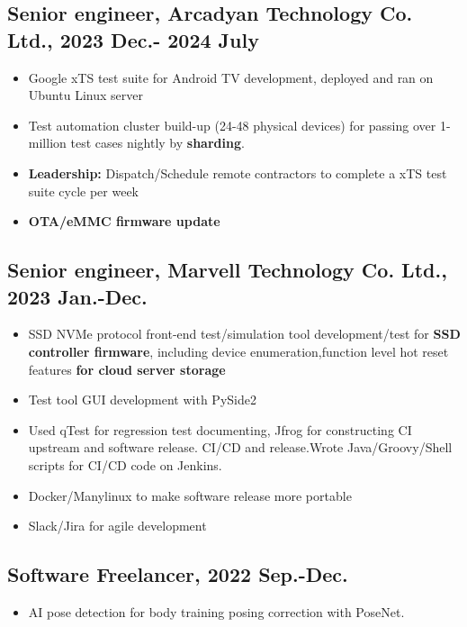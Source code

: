 \documentclass[11pt]{article}
\begin{document}
\begin{multicols*}{2}
\vspace{0.8em}

\subsection*{Senior engineer, Arcadyan Technology Co. Ltd., 2023 Dec.- 2024 July }
\begin{itemize}[noitemsep]
    \item Google xTS test suite for Android TV development, deployed and ran on Ubuntu Linux server
    \item Test automation cluster build-up (24-48 physical devices) for passing over 1-million test cases nightly by \textbf{sharding}.
    \item \textbf{Leadership:} Dispatch/Schedule remote contractors to complete a xTS test suite cycle per week
    \item \textbf{OTA/eMMC firmware update}
\end{itemize}

\vspace{0.8em}

\subsection*{Senior engineer, Marvell Technology Co. Ltd., 2023 Jan.-Dec.}
\begin{itemize}[noitemsep]
    \item SSD NVMe protocol front-end test/simulation tool development/test for \textbf{SSD controller firmware}, including device enumeration,function level hot reset features\textbf{ for cloud server storage}
    \item Test tool GUI development with PySide2
    \item Used qTest for regression test documenting, Jfrog for constructing CI upstream and software release. CI/CD and release.Wrote Java/Groovy/Shell scripts for CI/CD code on Jenkins.
    \item Docker/Manylinux to make software release more portable
    \item Slack/Jira for agile development
\end{itemize}

\vspace{0.8em}

\subsection*{Software Freelancer, 2022 Sep.-Dec.}
\begin{itemize}[noitemsep]
    \item AI pose detection for body training posing correction with PoseNet.
\end{itemize}


\end{multicols*}
\end{document}
